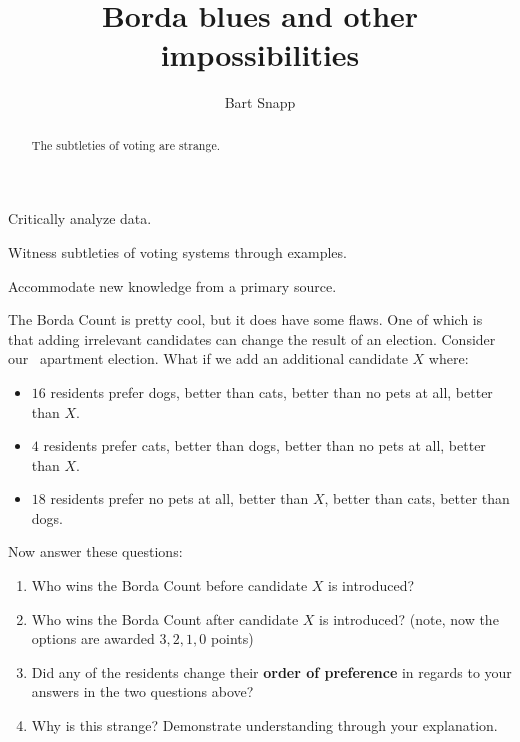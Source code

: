 \documentclass[nooutcomes,noauthor,hints,handout,12pt]{ximera}
\title{Borda blues and other impossibilities}
\author{Bart Snapp}
\begin{document}
\begin{abstract}
  The subtleties of voting are strange.
\end{abstract}
\maketitle

\begin{listOutcomes}
\item Critically analyze data.
\item Witness subtleties of voting systems through examples.
\item Accommodate new knowledge from a primary source. 
\end{listOutcomes}



\mynewpage

\begin{question}
The Borda Count is pretty cool, but it does have some flaws. One of
which is that adding irrelevant candidates can change the result of an
election. Consider our \mooculus~apartment election. What if we add an additional candidate $X$ where:

\begin{itemize}
\item $16$ residents prefer dogs, better than cats, better than no pets at all, better than $X$.
\item $4$ residents prefer cats, better than dogs, better than no pets at all, better than $X$.
\item $18$ residents prefer no pets at all, better than $X$, better than cats, better
  than dogs.
\end{itemize}
Now answer these questions:
\begin{enumerate}
\item Who wins the Borda Count before candidate $X$ is introduced?
\item Who wins the Borda Count after candidate $X$ is introduced? (note,
  now the options are awarded $3,2,1,0$ points)
\item Did any of the residents change their \textbf{order of preference} in
  regards to your answers in the two questions above?
\item Why is this strange? Demonstrate understanding through your
  explanation.
\end{enumerate}
\end{question}
\mynewpage
\end{document}
